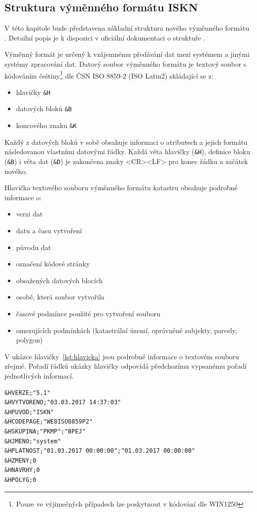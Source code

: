 \subsection{Struktura výměnného formátu ISKN}
V této kapitole bude představena základní struktura nového výměnného
formátu . Detailní popis je k dispozici v oficiální
dokumentaci o struktuře \cite{struktura_ISKN}.

Výměnný formát je určený k vzájemnému předávání dat mezi systémem
 a jinými systémy zpracování dat. Datový soubor výměnného
formátu je textový soubor s kódováním češtiny\footnote{Pouze ve
  výjimečných případech lze poskytnout v kódování dle WIN1250} dle ČSN
ISO 8859-2 (ISO Latin2) skládající se z:
\begin{itemize}[leftmargin=50pt]
		\item hlavičky \verb|&H|
		\item datových bloků \verb|&B|
		\item koncového znaku \verb|&K|
\end{itemize}

Každý z datových bloků v sobě obsahuje informaci o atributech a jejich formátu následovanou vlastními datovými řádky. Každá věta hlavičky (\verb|&H|), definice bloku (\verb|&B|) i věta dat (\verb|&D|) je zakončena znaky <CR><LF> pro konec řádku a začátek nového. %

Hlavička textového souboru výměnného formátu katastru obsahuje podrobné informace o:
\begin{itemize}[leftmargin=50pt]
		\item verzi dat
		\item datu a času vytvoření
		\item původu dat
		\item označení kódové stránky
		\item obsažených datových blocích
		\item osobě, která soubor vytvořila
		\item časové podmínce použité pro vytvoření souboru
		\item omezujících podmínkách (katastrální území, oprávněné subjekty, parcely, polygon)
\end{itemize}
V ukázce hlavičky~\ref{lst:hlavicka} jsou podrobné informace o
textovém souboru zřejmé. Pořadí řádků ukázky hlavičky odpovídá
předchozímu vypsanému pořadí jednotlivých informací.
\begin{lstlisting}[caption=Ukázka hlavičky neúplných dat, label=lst:hlavicka]
&HVERZE;"5.1"
&HVYTVORENO;"03.03.2017 14:37:03"
&HPUVOD;"ISKN"
&HCODEPAGE;"WE8ISO8859P2"
&HSKUPINA;"PKMP";"BPEJ"
&HJMENO;"system"
&HPLATNOST;"01.03.2017 00:00:00";"01.03.2017 00:00:00"
&HZMENY;0
&HNAVRHY;0
&HPOLYG;0
\end{lstlisting}

